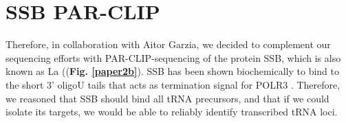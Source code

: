 \documentclass[12pt]{rockefeller}
\begin{document}
\section{SSB PAR-CLIP}
Therefore, in collaboration with Aitor Garzia, we decided to complement our sequencing efforts with PAR-CLIP-sequencing of the protein \gls{SSB}, which is also known as \gls{La} ((\textbf{Fig. \ref{paper2b}}). SSB has been shown biochemically to bind to the short 3’ oligoU tails \cite{Stefano:1984wp} that acts as termination signal for POLR3 \cite{Maraia:2010kx}. Therefore, we reasoned that SSB should bind all tRNA precursors, and that if we could isolate its targets, we would be able to reliably identify transcribed tRNA loci. 

\end{document}

